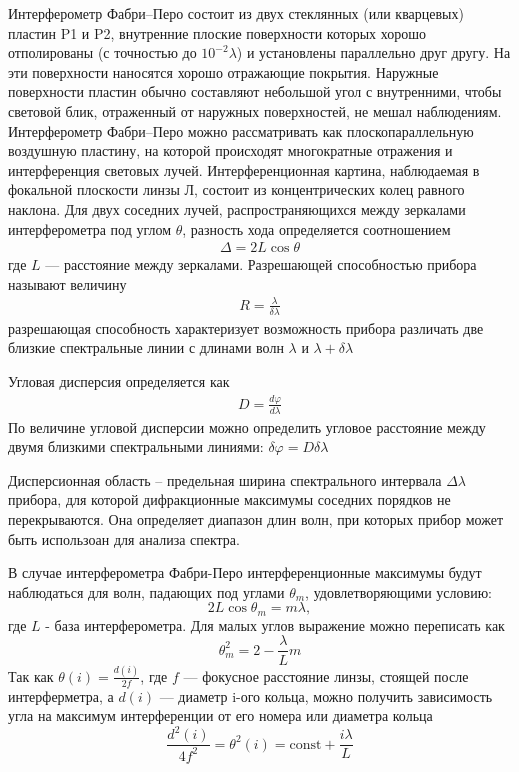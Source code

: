 \documentclass[a4paper,12pt]{article}
\theoremstyle{definition}
\begin{document}
Интерферометр Фабри–Перо состоит из двух стеклянных (или кварцевых) пластин P1 и P2,
внутренние плоские поверхности которых
хорошо отполированы (с точностью до $10^{-2}\lambda$) и установлены параллельно друг
другу. На эти поверхности наносятся хорошо отражающие покрытия. Наружные поверхности
пластин обычно составляют небольшой угол с внутренними, чтобы световой блик,
отраженный от наружных поверхностей, не мешал наблюдениям. Интерферометр Фабри–Перо можно
рассматривать как плоскопараллельную воздушную пластину, на которой происходят
многократные отражения и интерференция световых лучей. Интерференционная картина,
наблюдаемая в фокальной плоскости линзы Л, состоит из концентрических колец равного
наклона. Для двух соседних лучей, распространяющихся между зеркалами интерферометра
под углом $\theta$, разность хода определяется соотношением
\begin{align*}
\Delta = 2L\cos\theta
\end{align*}
где $L$ --- расстояние между зеркалами.
Разрешающей способностью прибора называют величину
\begin{align*}
R = \frac{\lambda}{\delta\lambda}
\end{align*}
разрешающая способность характеризует возможность прибора различать
две близкие спектральные линии с длинами волн $\lambda$ и $\lambda+\delta\lambda$

Угловая дисперсия определяется как
\begin{align*}
D = \frac{d\varphi}{d\lambda}
\end{align*} 
По величине угловой дисперсии можно определить угловое расстояние между двумя
близкими спектральными линиями: $\delta\varphi = D\delta\lambda$

Дисперсионная область – предельная ширина спектрального интервала $\Delta\lambda$ прибора, для которой дифракционные максимумы соседних порядков не перекрываются. Она определяет диапазон
длин волн, при которых прибор может быть использоан для анализа спектра.

В случае интерферометра Фабри-Перо интерференционные
максимумы будут наблюдаться для волн, падающих под углами $\theta_{m}$, удовлетворяющими
условию:
\begin{equation}\label{max_inter}
    2L\cos{\theta_{m}} = m\lambda,
\end{equation}
где $L$ - база интерферометра. Для малых углов выражение можно переписать как 
\begin{equation}
\label{eq:1}
\theta_m^2 = 2 - \frac{\lambda}{L}m
\end{equation}
Так как  $\theta(i) = \frac{d(i)}{2f}$, где $f$ --- фокусное расстояние линзы, стоящей после интерферметра, а $d(i)$ --- диаметр i-ого кольца, можно
получить зависимость угла на максимум интерференции от его номера или диаметра кольца 
\begin{equation}
\label{eq:2}
\frac{d^2(i)}{4f^2} = \theta^2(i) = \text{const} + \frac{i\lambda}{L}
\end{equation}
\end{document}
